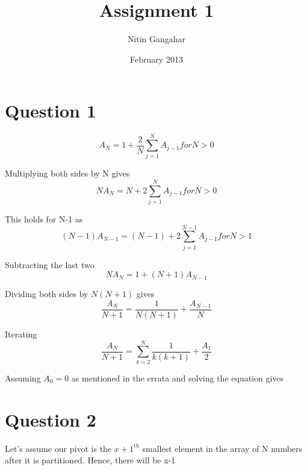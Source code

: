 \documentclass[a4paper,12pt]{article}
\begin{document}
\title{Assignment 1}
\author{Nitin Gangahar}
\date{February 2013}
\maketitle

\section*{Question 1}

\begin{equation}
	A_N = 1 + \frac{2}{N} \sum_{j=1}^{N} A_{j-1}  for N > 0
\end{equation}

Multiplying both sides by N gives
\begin{equation}
	NA_N = N + 2 \sum_{j=1}^{N} A_{j-1} for N > 0
\end{equation}

This holds for N-1 as
\begin{equation}
	(N-1)A_{N-1} = (N-1) + 2\sum_{j=1}^{N-1} A_{j-1} for N > 1 
\end{equation}

Subtracting the last two
\begin{equation}
	NA_N = 1 + (N+1)A_{N-1}
\end{equation}

Dividing both sides by $N(N+1)$ gives
\begin{equation}
	\frac{A_N}{N+1} = \frac{1}{N(N+1)} + \frac{A_{N-1}}{N}
\end{equation}

Iterating
\begin{equation}
	\frac{A_N}{N+1} = \sum_{k=2}^{N}\frac{1}{k(k+1)} + \frac{A_1}{2}
\end{equation}

Assuming $A_0 = 0$ as mentioned in the errata and solving the equation gives

\centerline{}

\newpage
\section*{Question 2}
Let's assume our pivot is the $x+1^{th}$ smallest element in the array of N numbers after it is partitioned. Hence, there will be x-1
\end{document}
